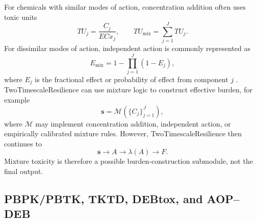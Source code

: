 	For chemicals with similar modes of action, concentration addition often uses toxic units
	\begin{equation}
		TU_j=\frac{C_j}{ECx_j},
		\qquad
		TU_{\mathrm{mix}}=\sum_{j=1}^J TU_j.
	\end{equation}
	For dissimilar modes of action, independent action is commonly represented as
	\begin{equation}
		E_{\mathrm{mix}}=1-\prod_{j=1}^J(1-E_j),
	\end{equation}
	where $E_j$ is the fractional effect or probability of effect from component $j$ \citep{bopp2019mixtures,kienzler2017mixtures}. TwoTimescaleResilience can use mixture logic to construct effective burden, for example
	\begin{equation}
		\mathbf{s}=\mathcal{M}(\{C_j\}_{j=1}^J),
	\end{equation}
	where $\mathcal{M}$ may implement concentration addition, independent action, or empirically calibrated mixture rules. However, TwoTimescaleResilience then continues to
	\begin{equation}
		\mathbf{s}\rightarrow A\rightarrow\lambda(A)\rightarrow F.
	\end{equation}
	Mixture toxicity is therefore a possible burden-construction submodule, not the final output.
	
	\subsection{PBPK/PBTK, TKTD, DEBtox, and AOP--DEB}
	
